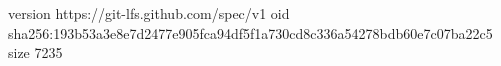 version https://git-lfs.github.com/spec/v1
oid sha256:193b53a3e8e7d2477e905fca94df5f1a730cd8c336a54278bdb60e7c07ba22c5
size 7235
